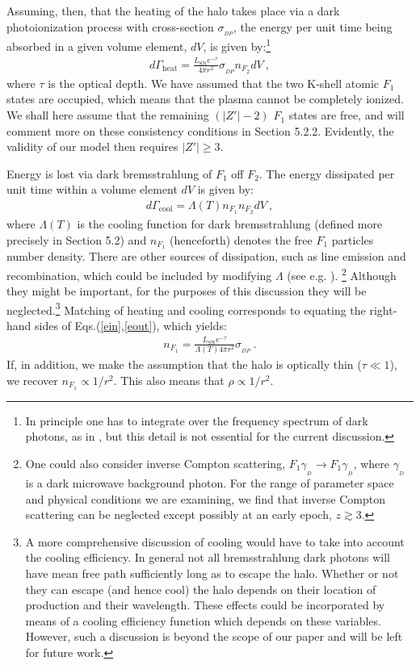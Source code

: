\documentclass[12pt]{article}
\begin{document}
{{Assuming, then, that the heating of the halo takes place via a dark
photoionization process with cross-section $\sigma _{_{DP}}$, the energy
per unit time being absorbed in a given volume element, $dV$, is given
by:\footnote{In principle one has to integrate over the frequency
spectrum of dark photons, as in \cite{depth4}, but this detail is not
essential for the current discussion.}
%
\begin{eqnarray}
d\Gamma _{\text{heat}} = \frac{L _{\text{SN}}e ^{-\tau}}{4\pi r
^2}\sigma _{_{DP}}n _{F_2} dV \ ,
\label{ein}
\end{eqnarray}
%
where $\tau$ is the optical depth. We have assumed that the two K-shell
atomic $F_1$ states are occupied, which means that the plasma cannot be
completely ionized. We shall here assume that the remaining $(|Z'|-2)$
$F_1$ states are free, and will comment more on these consistency
conditions in Section 5.2.2. Evidently, the validity of our model then
requires $|Z'| \geq 3$.

Energy is lost via dark bremsstrahlung of $F _1$ off $F _2$. The energy
dissipated per unit time within a volume element $dV$ is given by:
%
\begin{eqnarray}
d\Gamma _{\text{cool}} = \Lambda (T) n _{F_1}n _{F_2} dV \ ,
\label{eout}
\end{eqnarray}
%
where $\Lambda(T)$ is the cooling function for dark bremsstrahlung
(defined more precisely in Section 5.2) and $n _{F_1}$ (henceforth)
denotes the free $F_1$ particles number density. There are other sources
of dissipation,
such as line emission and recombination, which
could be included by modifying $\Lambda$ (see e.g. \cite{radiative}).
\footnote{One could also consider inverse Compton
scattering, $F_1 \gamma _{_D} \rightarrow F_1 \gamma _{_D}$, where
$\gamma _{_D}$ is a dark microwave background photon. For the range of
parameter space and physical conditions we are examining, we find that
inverse Compton scattering can be neglected except possibly at an early
epoch, $z \gtrsim 3$.} 
Although they might be important, for the purposes of this discussion
they will be neglected.\footnote{A more comprehensive discussion of
cooling would have to take into account the cooling efficiency. In
general not all bremsstrahlung dark photons will have mean free path
sufficiently long as to escape the halo. Whether or not they can escape
(and hence cool) the halo depends on their location of production and
their wavelength. These effects could be incorporated by means of a
cooling efficiency function which depends on these variables. However,
such a discussion is beyond the scope of our paper and will be left for
future work.} Matching of heating and cooling corresponds to equating
the right-hand sides of Eqs.(\ref{ein},\ref{eout}), which yields:
%
\begin{eqnarray}
n _{F_1} = \frac{L _{\text{SN}}e ^{-\tau}}{\Lambda (T)4\pi r ^2}\sigma
_{_{DP}} \ .
\label{match}
\end{eqnarray}
%
If, in addition, we make the assumption that the halo is optically thin
($\tau \ll 1$), we recover $n _{F_1} \propto 1/r ^2$. This also means
that $\rho \propto 1/r ^2$.

}}
\end{document}
